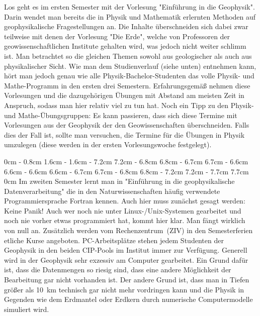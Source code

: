 \begin{multicols}{2}
Los geht es im ersten Semester mit der Vorlesung "Einführung in die Geophysik".
Darin wendet man bereits die in Physik und Mathematik erlernten Methoden auf geophysikalische Fragestellungen an.
Die Inhalte überschneiden sich dabei zwar teilweise mit denen der Vorlesung "Die Erde", welche von Professoren der geowissenschaftlichen Institute gehalten wird, was jedoch nicht weiter schlimm ist.
Man betrachtet so die gleichen Themen sowohl aus geologischer als auch aus physikalischer Sicht.
Wie man dem Studienverlauf (siehe unten) entnehmen kann, hört man jedoch genau wie alle Physik-Bachelor-Studenten das volle Physik- und Mathe-Programm in den ersten drei Semestern.
Erfahrungsgemäß nehmen diese Vorlesungen und die dazugehörigen Übungen mit Abstand am meisten Zeit in Anspruch, sodass man hier relativ viel zu tun hat.
Noch ein Tipp zu den Physik- und Mathe-Übungsgruppen: Es kann passieren, dass sich diese Termine mit Vorlesungen aus der Geophysik der den Geowissenschaften überschneiden.
Falls dies der Fall ist, sollte man versuchen, die Termine für die Übungen in Physik umzulegen (diese werden in der ersten Vorlesungswoche festgelegt).

0cm \columnwidth
0cm \columnwidth
0cm \columnwidth
0cm \columnwidth
0cm \columnwidth
0cm \columnwidth
0cm \columnwidth
0cm \columnwidth
0cm \columnwidth
0cm \columnwidth
0cm \columnwidth
0cm \columnwidth
0.8cm \dimexpr\columnwidth - 0.8cm
1.6cm \dimexpr\columnwidth - 1.6cm
\dimexpr\columnwidth - 7.2cm 7.2cm
\dimexpr\columnwidth - 6.8cm 6.8cm
\dimexpr\columnwidth - 6.7cm 6.7cm
\dimexpr\columnwidth - 6.6cm 6.6cm
\dimexpr\columnwidth - 6.6cm 6.6cm
\dimexpr\columnwidth - 6.7cm 6.7cm
\dimexpr\columnwidth - 6.8cm 6.8cm
\dimexpr\columnwidth - 7.2cm 7.2cm
\dimexpr\columnwidth - 7.7cm 7.7cm
0cm \columnwidth
Im zweiten Semester lernt man in "Einführung in die geophysikalische Datenverarbeitung" die in den Naturwissenschaften häufig verwendete Programmiersprache Fortran kennen.
Auch hier muss zunächst gesagt werden: Keine Panik! Auch wer noch nie unter Linux-/Unix-Systemen gearbeitet und noch nie vorher etwas programmiert hat, kommt hier klar.
Man fängt wirklich von null an.
Zusätzlich werden vom Rechenzentrum~(ZIV) in den Semesterferien etliche Kurse angeboten.
PC-Arbeitsplätze stehen jedem Studenten der Geophysik in den beiden CIP-Pools im Institut immer zur Verfügung.
Generell wird in der Geophysik sehr exzessiv am Computer gearbeitet.
Ein Grund dafür ist, dass die Datenmengen so riesig sind, dass eine andere Möglichkeit der Bearbeitung gar nicht vorhanden ist.
Der andere Grund ist, dass man in Tiefen größer als \SI{10}{\km} technisch gar nicht mehr vordringen kann und die Physik in Gegenden wie dem Erdmantel oder Erdkern durch numerische Computermodelle simuliert wird.


\end{multicols}

